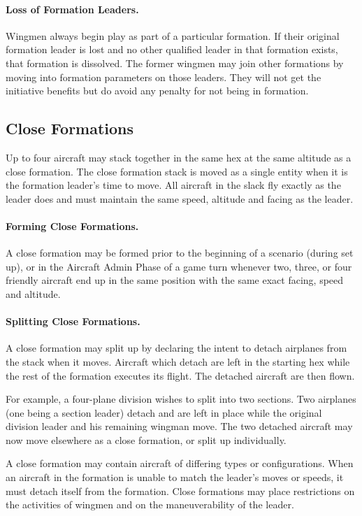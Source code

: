 \begin{advancedrules}
{\paragraph{Loss of Formation Leaders.} Wingmen always begin play as part of a particular formation. If their original formation leader is lost and no other qualified leader in that formation exists, that formation is dissolved. The former wingmen may join other formations by moving into formation parameters on those leaders. They will not get the initiative benefits but do avoid any penalty for not being in formation.

\subsection{Close Formations}
\label{rule:close-formations}

Up to four aircraft may stack together in the same hex at the same altitude as a close formation. The close formation stack is moved as a single entity when it is the formation leader's time to move. All aircraft in the slack fly exactly as the leader does and must maintain the same speed, altitude and facing as the leader.

\paragraph{Forming Close Formations.} A close formation may be formed prior to the beginning of a scenario (during set up), or in the Aircraft Admin Phase of a game turn whenever two, three, or four friendly aircraft end up in the same position with the same exact facing, speed and altitude.

\paragraph{Splitting Close Formations.} A close formation may split up by declaring the intent to detach airplanes from the stack when it moves. Aircraft which detach are left in the starting hex while the rest of the formation executes its flight. The detached aircraft are then flown.

For example, a four-plane division wishes to split into two sections. Two airplanes (one being a section leader) detach and are left in place while the original division leader and his remaining wingman move. The two detached aircraft may now move elsewhere as a close formation, or split up individually.

A close formation may contain aircraft of differing types or configurations. When an aircraft in the formation is unable to match the leader's moves or speeds, it must detach itself from the formation. Close formations may place restrictions on the activities of wingmen and on the maneuverability of the leader.

}
\end{advancedrules}
